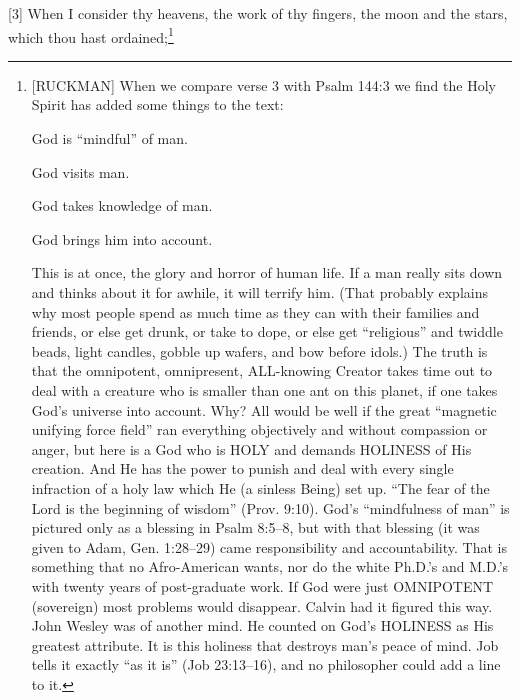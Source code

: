 [3] \textcolor[rgb]{0.00,0.00,1.00}{When I consider thy heavens, the work of thy fingers, the moon and the stars, which thou hast ordained;}\footnote{[RUCKMAN] When we compare verse 3 with Psalm 144:3 we find the Holy Spirit has added some things to the text:
\begin{compactenum}
\item God is “mindful” of man.
\item God visits man.
\item God takes knowledge of man.
\item God brings him into account.
\end{compactenum}
 This is at once, the glory and horror of human life. If a man really sits down and thinks about it for awhile, it will terrify him. (That probably explains why most people spend as much time as they can with their families and friends, or else get drunk, or take to dope, or else get “religious” and twiddle beads, light candles, gobble up wafers, and bow before idols.) The truth is that the omnipotent, omnipresent, ALL-knowing Creator takes time out to deal with a creature who is smaller than one ant on this planet, if one takes God’s universe into account. Why? All would be well if the great “magnetic unifying force field” ran everything objectively and without compassion or anger, but here is a God who is HOLY and demands HOLINESS of His creation. And He has the power to punish and deal with every single infraction of a holy law which He (a sinless Being) set up. “The fear of the Lord is the beginning of wisdom” (Prov. 9:10). God’s “mindfulness of man” is pictured only as a blessing in Psalm 8:5--8, but with that blessing (it was given to Adam, Gen. 1:28--29) came responsibility and accountability. That is something that no Afro-American wants, nor do the white Ph.D.’s and M.D.’s with twenty years of post-graduate work. If God were just OMNIPOTENT (sovereign) most problems would disappear. Calvin had it figured this way. John Wesley was of another mind. He counted on God’s HOLINESS as His greatest attribute. It is this holiness that destroys man’s peace of mind. Job tells it exactly “as it is” (Job 23:13--16), and no philosopher could add a line to it.\cite{Ruckman1992Psalms}}
